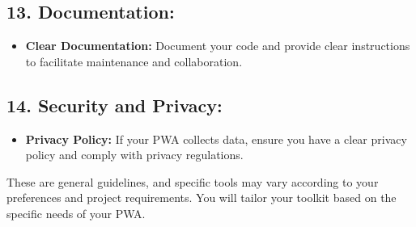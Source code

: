 \documentclass{article}
\begin{document}
\subsection*{13. Documentation:}
\begin{itemize}
  \item \textbf{Clear Documentation:} Document your code and provide clear instructions to facilitate maintenance and collaboration.
\end{itemize}

\subsection*{14. Security and Privacy:}
\begin{itemize}
  \item \textbf{Privacy Policy:} If your PWA collects data, ensure you have a clear privacy policy and comply with privacy regulations.
\end{itemize}

These are general guidelines, and specific tools may vary according to your preferences and project requirements. You will tailor your toolkit based on the specific needs of your PWA.


\pagebreak

\citep{latexproject5,latexproject6}
\end{document}
